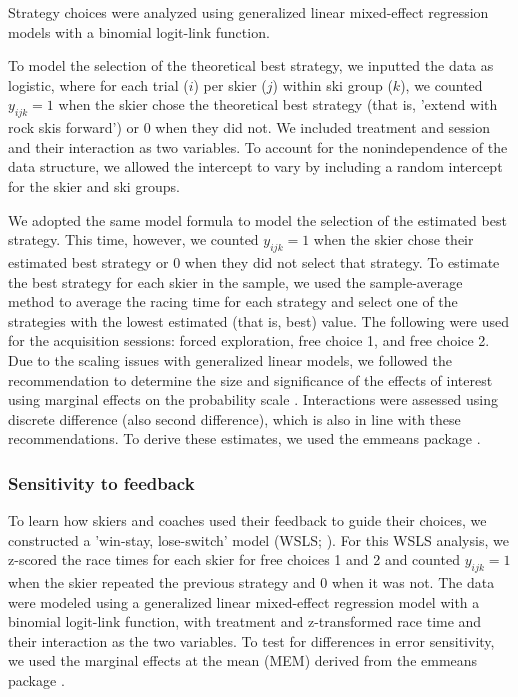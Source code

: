 \documentclass{article}
\begin{document}
Strategy choices were analyzed using generalized linear mixed-effect regression models with a binomial logit-link function.

To model the selection of the theoretical best strategy, we inputted the data as logistic, where for each trial (\(i\)) per skier (\(j\)) within ski group (\(k\)), we counted \(y_{ijk}=1\) when the skier chose the theoretical best strategy (that is, 'extend with rock skis forward') or 0 when they did not. We included treatment and session and their interaction as two variables. To account for the nonindependence of the data structure, we allowed the intercept to vary by including a random intercept for the skier and ski groups.

 We adopted the same model formula to model the selection of the estimated best strategy. This time, however, we counted \(y_{ijk}=1\) when the skier chose their estimated best strategy or 0 when they did not select that strategy. To estimate the best strategy for each skier in the sample, we used the sample-average method \cite{sutton_reinforcement_2018} to average the racing time for each strategy and select one of the strategies with the lowest estimated (that is, best) value. The following were used for the acquisition sessions: forced exploration, free choice 1, and free choice 2. Due to the scaling issues with generalized linear models, we followed the recommendation to determine the size and significance of the effects of interest using marginal effects on the probability scale \cite{mize_best_2019, mccabe_interpreting_2022}. Interactions were assessed using discrete difference (also second difference), which is also in line with these recommendations. To derive these estimates, we used the emmeans package \cite{lenth_emmeans_2023}.

 \subsubsection{Sensitivity to feedback}

To learn how skiers and coaches used their feedback to guide their choices, we constructed a 'win-stay, lose-switch' model (WSLS; \cite{nowak_strategy_1993, worthy_comparison_2014, iyer_probing_2020}). For this WSLS analysis, we z-scored the race times for each skier for free choices 1 and 2 and counted \(y_{ijk}=1\) when the skier repeated the previous strategy and 0 when it was not. The data were modeled using a generalized linear mixed-effect regression model with a binomial logit-link function, with treatment and z-transformed race time and their interaction as the two variables. To test for differences in error sensitivity, we used the marginal effects at the mean (MEM) derived from the emmeans package \cite{lenth_emmeans_2023}.
\end{document}
